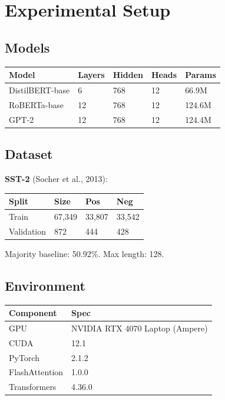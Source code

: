 \section{Experimental Setup}

\subsection{Models}

\begin{table}[H]
\centering
\small
\begin{tabular}{lllll}
\toprule
\textbf{Model} & \textbf{Layers} & \textbf{Hidden} & \textbf{Heads} & \textbf{Params} \\
\midrule
DistilBERT-base & 6 & 768 & 12 & 66.9M \\
RoBERTa-base & 12 & 768 & 12 & 124.6M \\
GPT-2 & 12 & 768 & 12 & 124.4M \\
\bottomrule
\end{tabular}
\end{table}

\subsection{Dataset}

\textbf{SST-2} (Socher et al., 2013):

\begin{table}[H]
\centering
\small
\begin{tabular}{llll}
\toprule
\textbf{Split} & \textbf{Size} & \textbf{Pos} & \textbf{Neg} \\
\midrule
Train & 67,349 & 33,807 & 33,542 \\
Validation & 872 & 444 & 428 \\
\bottomrule
\end{tabular}
\end{table}

Majority baseline: 50.92\%. Max length: 128.

\subsection{Environment}

\begin{table}[H]
\centering
\small
\begin{tabular}{ll}
\toprule
\textbf{Component} & \textbf{Spec} \\
\midrule
GPU & NVIDIA RTX 4070 Laptop (Ampere) \\
CUDA & 12.1 \\
PyTorch & 2.1.2 \\
FlashAttention & 1.0.0 \\
Transformers & 4.36.0 \\
\bottomrule
\end{tabular}
\end{table}

